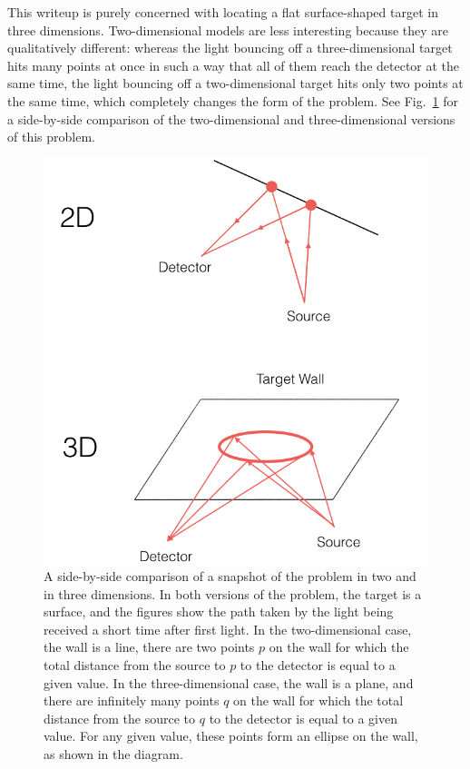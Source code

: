 \documentclass[11pt]{article}
\begin{document}
This writeup is purely concerned with locating a flat surface-shaped target in three dimensions. Two-dimensional models are less interesting because they are qualitatively different: whereas the light bouncing off a three-dimensional target hits many points at once in such a way that all of them reach the detector at the same time, the light bouncing off a two-dimensional target hits only two points at the same time, which completely changes the form of the problem. See Fig.~\ref{fig:twodthreed} for a side-by-side comparison of the two-dimensional and three-dimensional versions of this problem.

\begin{figure}
\begin{center}
\centering
\includegraphics[scale=0.6]{figs/twodthreed.png}
\caption{A side-by-side comparison of a snapshot of the problem in two and in three dimensions. In both versions of the problem, the target is a surface, and the figures show the path taken by the light being received a short time after first light. In the two-dimensional case, the wall is a line, there are two points $p$ on the wall for which the total distance from the source to $p$ to the detector is equal to a given value. In the three-dimensional case, the wall is a plane, and there are infinitely many points $q$ on the wall for which the total distance from the source to $q$ to the detector is equal to a given value. For any given value, these points form an ellipse on the wall, as shown in the diagram. \label{fig:twodthreed}}
\end{center}
\end{figure}
\end{document}
